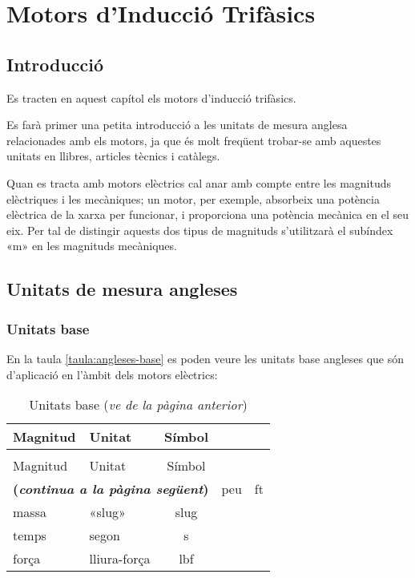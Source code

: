 \chapter{Motors d'Inducció Trifàsics}\label{sec:motors-ind}

\section{Introducció}

Es tracten en aquest capítol els motors d'inducció trifàsics.

Es farà primer una petita introducció a les unitats de mesura anglesa relacionades amb els motors, ja que és molt freqüent trobar-se amb aquestes unitats en llibres, articles tècnics i catàlegs.

Quan es tracta amb motors elèctrics cal anar amb compte entre les magnituds elèctriques i les mecàniques; un motor, per exemple, absorbeix una potència elèctrica de la xarxa per funcionar, i proporciona una potència mecànica en el seu eix. Per tal de distingir aquests dos tipus de magnituds s'utilitzarà el subíndex «m» en les magnituds mecàniques.

\section{Unitats de mesura angleses}

\subsection{Unitats base}

En la taula \vref{taula:angleses-base} es poden veure les unitats base angleses que són d'aplicació en l'àmbit dels motors elèctrics:
\begin{longtable}[h]{llc}
   \caption{\label{taula:angleses-base}Unitats angleses base}\\
   \toprule[1pt]
    Magnitud & Unitat & Símbol \\
   \midrule
   \endfirsthead
   \caption[]{Unitats base (\emph{ve de la pàgina anterior})}\\
   \toprule[1pt]
    Magnitud & Unitat & Símbol \\
   \midrule
   \endhead
   \midrule
   \multicolumn{3}{r}{\sffamily\bfseries\color{NavyBlue}(\emph{continua a la pàgina següent})}
   \endfoot
   \endlastfoot
   longitud & peu & ft \\
   massa & «slug» & slug \\
   temps & segon & s\\
   força & lliura-força & lbf \\
   \bottomrule[1pt]
\end{longtable}

